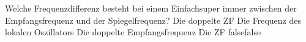     {Welche Frequenzdifferenz besteht bei einem Einfachsuper immer zwischen der Empfangsfrequenz und der Spiegelfrequenz?}
    {Die doppelte ZF}
    {Die Frequenz des lokalen Oszillators}
    {Die doppelte Empfangsfrequenz}
    {Die ZF}
    {false}{false}
